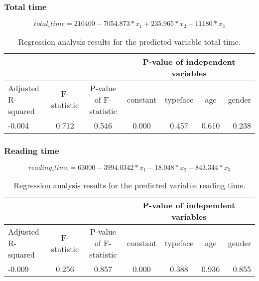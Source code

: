 \documentclass{article}
\begin{document}
\subsubsection*{Total time}
\begin{equation}
total\_time = 210400 - 7054.873 * x_1 + 235.965 * x_2 - 11180 * x_3
\label{eq:totaltimeregression}
\end{equation}
\begin{table}[H]
\centering
\begin{tabular}{ l|c|c|c|c|c|r } 
     \multicolumn{3}{c}{} & \multicolumn{4}{c}{\textbf{P-value of independent variables}} \\
    \hline
     Adjusted R-squared & F-statistic & P-value of F-statistic & constant & typeface & age & gender \\
     -0.004 & 0.712 & 0.546 & 0.000 & 0.457 & 0.610 & 0.238 \\
\end{tabular}
\caption{\label{tab:totaltimereg}Regression analysis results for the predicted variable total time.}
\end{table}

\subsubsection*{Reading time}
\begin{equation}
reading\_time = 63000 - 3994.0342 * x_1 - 18.048 * x_2 - 843.344 * x_3
\label{eq:readingtimeregression}
\end{equation}
\begin{table}[H]
\centering
\begin{tabular}{ l|c|c|c|c|c|r } 
     \multicolumn{3}{c}{} &
     \multicolumn{4}{c}{\textbf{P-value of independent variables}} \\
    \hline
     Adjusted R-squared & F-statistic & P-value of F-statistic & constant & typeface & age & gender \\
     -0.009 & 0.256 & 0.857 & 0.000 & 0.388 & 0.936 & 0.855\\ 
\end{tabular}
\caption{\label{tab:readingtimereg}Regression analysis results for the predicted variable reading time.}
\end{table}
\end{document}
